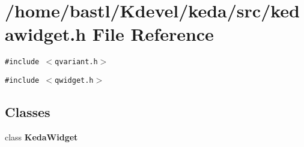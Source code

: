 \section{/home/bastl/Kdevel/keda/src/kedawidget.h File Reference}
\label{kedawidget_8h}
{\tt \#include $<$qvariant.h$>$}\par
{\tt \#include $<$qwidget.h$>$}\par
\subsection*{Classes}
\begin{CompactItemize}
\item 
class {\bf Keda\-Widget}
\end{CompactItemize}
